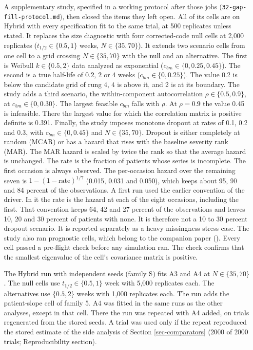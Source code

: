 \documentclass[
  11pt,
]{article}
\newcounter{none} %
\begin{document}
A supplementary study, specified in a working protocol after those
jobs (\texttt{32-gap-fill-protocol.md}), then closed the items they left
open. All of its cells are on Hybrid with every specification fit to
the same trial, at 500 replicates unless stated. It replaces the
size diagnostic with four corrected-code null cells at 2,000
replicates (\(t_{1/2} \in \{0.5, 1\}\) weeks, \(N \in \{35, 70\}\)). It
extends two scenario cells from one cell to a grid crossing \(N
\in \{35, 70\}\) with the null and an alternative. The first is
Weibull \(k \in \{0.5, 2\}\) data analyzed as exponential (\(c_{bm} \in
\{0, 0.25, 0.45\}\)). The second is a true half-life of 0.2, 2 or 4
weeks (\(c_{bm} \in \{0, 0.25\}\)). The value 0.2 is below the
candidate grid of rung 4, 4 is above it, and 2 is at its boundary.
The study adds a third scenario, the within-component autocorrelation
\(\rho \in \{0.5, 0.9\}\), at \(c_{bm} \in \{0, 0.30\}\). The largest
feasible \(c_{bm}\) falls with \(\rho\). At \(\rho = 0.9\) the value 0.45
is infeasible. There the largest value for which the correlation
matrix is positive definite is 0.391. Finally, the study imposes
monotone dropout at rates of 0.1, 0.2 and 0.3, with \(c_{bm} \in \{0,
0.45\}\) and \(N \in \{35, 70\}\). Dropout is either completely at
random (MCAR) or has a hazard that rises with the baseline severity
rank (MAR). The MAR hazard is scaled by twice the rank so that the
average hazard is unchanged. The rate is the fraction of patients
whose series is incomplete. The first occasion is always observed.
The per-occasion hazard over the remaining seven is \(1 - (1 -
\text{rate})^{1/7}\) (0.015, 0.031 and 0.050), which keeps about 95,
90 and 84 percent of the observations. A first run used the earlier
convention of the driver. In it the rate is the hazard at each of the
eight occasions, including the first. That convention keeps 64, 42
and 27 percent of the observations and leaves 10, 20 and 30 percent
of patients with none.
It is therefore not a 10 to 30 percent dropout scenario. It is
reported separately as a heavy-missingness stress case. The study
also ran prognostic cells, which belong to the companion paper
(). Every cell passed a pre-flight check
before any simulation ran. The check confirms that the smallest
eigenvalue of the cell's covariance matrix is positive.

The Hybrid run with independent seeds (family S) fits A3 and A4 at
\(N \in \{35, 70\}\). The null cells use \(t_{1/2} \in \{0.5, 1\}\) week
with 5,000 replicates each. The alternatives use \(\{0.5, 2\}\) weeks
with 1,000 replicates each. The run adds the patient-slope cell of
family 5. A4 was fitted in the same runs as the other analyses,
except in that cell. There the run was repeated with A4 added, on
trials regenerated from the stored seeds. A trial was used only if the
repeat reproduced the stored estimate of the side analysis of Section
\ref{sec-comparators} (2000 of
2000 trials;
Reproducibility section).
\end{document}

